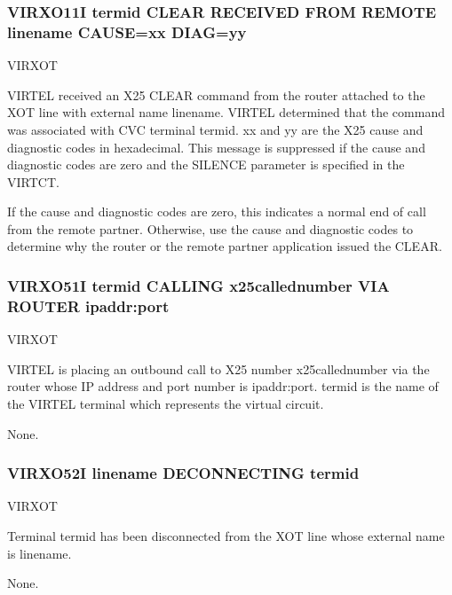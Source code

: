 \documentclass[letterpaper,10pt,english]{sphinxmanual}
\begin{document}
\subsubsection{VIRXO11I termid CLEAR RECEIVED FROM REMOTE linename CAUSE=xx DIAG=yy}
\label{\detokenize{messages:virxo11i-termid-clear-received-from-remote-linename-cause-xx-diag-yy}}\begin{description}
\sphinxAtStartPar
VIRXOT

\sphinxAtStartPar
VIRTEL received an X25 CLEAR command from the router attached to the XOT line with external name linename. VIRTEL determined that the command was associated with CVC terminal termid. xx and yy are the X25 cause and diagnostic codes in hexadecimal. This message is suppressed if the cause and diagnostic codes are zero and the SILENCE parameter is specified in the VIRTCT.

\sphinxAtStartPar
If the cause and diagnostic codes are zero, this indicates a normal end of call from the remote partner. Otherwise, use the cause and diagnostic codes to determine why the router or the remote partner application issued the CLEAR.

\end{description}


\subsubsection{VIRXO51I termid CALLING x25callednumber VIA ROUTER ipaddr:port}
\label{\detokenize{messages:virxo51i-termid-calling-x25callednumber-via-router-ipaddr-port}}\begin{description}
\sphinxAtStartPar
VIRXOT

\sphinxAtStartPar
VIRTEL is placing an outbound call to X25 number x25callednumber via the router whose IP address and port number is ipaddr:port. termid is the name of the VIRTEL terminal which represents the virtual circuit.

\sphinxAtStartPar
None.

\end{description}


\subsubsection{VIRXO52I linename DECONNECTING termid}
\label{\detokenize{messages:virxo52i-linename-deconnecting-termid}}\begin{description}
\sphinxAtStartPar
VIRXOT

\sphinxAtStartPar
Terminal termid has been disconnected from the XOT line whose external name is linename.

\sphinxAtStartPar
None.

\end{description}
\end{document}
